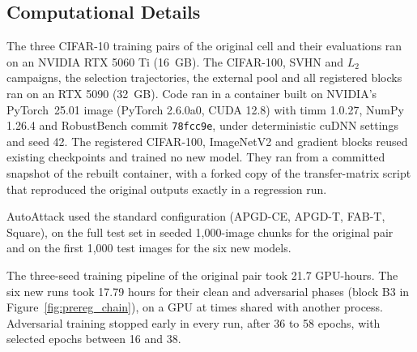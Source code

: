 \subsection{Computational Details}
\label{subsec:computational}

The three CIFAR-10 training pairs of the original cell and their evaluations ran on an NVIDIA RTX 5060 Ti (16~GB). The CIFAR-100, SVHN and $L_2$ campaigns, the selection trajectories, the external pool and all registered blocks ran on an RTX 5090 (32~GB). Code ran in a container built on NVIDIA's PyTorch~25.01 image (PyTorch 2.6.0a0, CUDA 12.8) with timm 1.0.27, NumPy 1.26.4 and RobustBench commit \texttt{78fcc9e}, under deterministic cuDNN settings and seed 42. The registered CIFAR-100, ImageNetV2 and gradient blocks reused existing checkpoints and trained no new model. They ran from a committed snapshot of the rebuilt container, with a forked copy of the transfer-matrix script that reproduced the original outputs exactly in a regression run.

AutoAttack used the standard configuration (APGD-CE, APGD-T, FAB-T, Square), on the full test set in seeded 1{,}000-image chunks for the original pair and on the first 1{,}000 test images for the six new models.

The three-seed training pipeline of the original pair took 21.7 GPU-hours. The six new runs took 17.79 hours for their clean and adversarial phases (block B3 in Figure~\ref{fig:prereg_chain}), on a GPU at times shared with another process. Adversarial training stopped early in every run, after 36 to 58 epochs, with selected epochs between 16 and 38.
